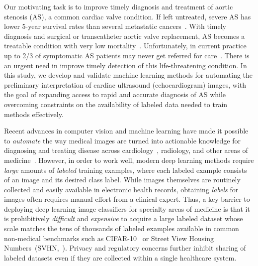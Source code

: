 
Our motivating task is to improve timely diagnosis and treatment of aortic stenosis (AS), a common cardiac valve condition.
If left untreated, severe AS has lower 5-year survival rates than several metastatic cancers~\citep{howladerSEERCancerStatistics2020,clarkFiveyearClinicalEconomic2012}.
With timely diagnosis and surgical or transcatheter aortic valve replacement, AS becomes a treatable condition with very low mortality~\citep{lancellottiOutcomesPatientsAsymptomatic2018}.
Unfortunately, in current practice up to 2/3 of symptomatic AS patients may never get referred for care~\citep{tangContemporaryReasonsClinical2018,brennanProviderlevelVariabilityTreatment2019}.
There is an urgent need in improve timely detection of this life-threatening condition.
In this study, we develop and validate machine learning methods for automating the preliminary interpretation of cardiac ultrasound (echocardiogram) images, with the goal of expanding access to rapid and accurate diagnosis of AS while overcoming constraints on the availability of labeled data needed to train methods effectively.

Recent advances in computer vision and machine learning have made it possible to \emph{automate} the way medical images are turned into actionable knowledge for diagnosing and treating disease across cardiology~\citep{chenDeepLearningCardiac2020}, radiology, and other areas of medicine~\citep{shenDeepLearningMedical2017}.
However, in order to work well, modern deep learning methods require \emph{large} amounts of \emph{labeled} training examples, where each labeled example consists of an image and its desired class label.
While images themselves are routinely collected and easily available in electronic health records, obtaining \emph{labels} for images often requires manual effort from a clinical expert.
Thus, a key barrier to deploying deep learning image classifiers for specialty areas of medicine is that it is prohibitively \emph{difficult} and \emph{expensive} to acquire a large labeled dataset whose scale matches the tens of thousands of labeled examples available in common non-medical benchmarks such as CIFAR-10~\citep{krizhevskyLearningMultipleLayers2009} or Street View Housing Numbers~(SVHN,~\citet{netzerReadingDigitsNatural2011}). Privacy and regulatory concerns further inhibit sharing of labeled datasets even if they are collected within a single healthcare system.


